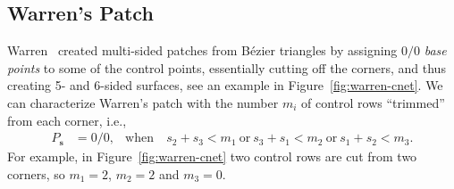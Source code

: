 \documentclass[9pt,academicons]{article}
\begin{document}
\subsection{Warren's Patch}
\label{subsec:warren}
Warren~\cite{Warren:1992} created multi-sided patches from B\'ezier triangles by assigning $0/0$
\emph{base points} to some of the control points, essentially cutting off the corners, and thus
creating 5- and 6-sided surfaces, see an example in Figure~\ref{fig:warren-cnet}.
We can characterize Warren's patch with the number $m_i$ of control rows
``trimmed'' from each corner, i.e.,
\begin{equation}
  \begin{aligned}
    P_\mathbf{s}&=0/0, & \mathrm{when}\ &
    s_2+s_3<m_1\ \mathrm{or}\ s_3+s_1<m_2\ \mathrm{or}\ s_1+s_2<m_3.
  \end{aligned}
\end{equation}
For example, in Figure~\ref{fig:warren-cnet} two control rows are cut from two corners,
so $m_1=2$, $m_2=2$ and $m_3=0$.
\end{document}
